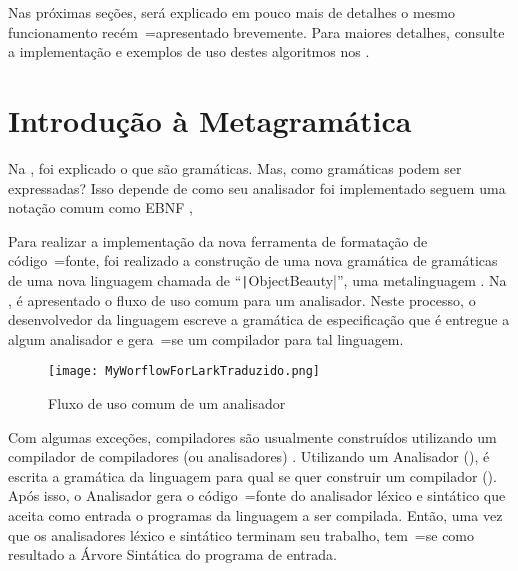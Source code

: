 Nas próximas seções,
será explicado em pouco mais de detalhes o mesmo funcionamento recém~=apresentado brevemente.
Para maiores detalhes,
consulte a implementação e
exemplos de uso destes algoritmos nos .


\section{Introdução à Metagramática}
\label{section:GrammarsGrammar}

Na ,
foi explicado o que são gramáticas.
Mas,
como gramáticas podem ser expressadas?
Isso depende de como seu analisador foi implementado  seguem uma notação comum como EBNF \cite{teachingEbnf,antlrBookTerrentParr,larkGrammarReference,larkStyleCheat},

Para realizar a implementação da nova ferramenta de formatação de código~=fonte,
foi realizado a construção de uma nova gramática de gramáticas de uma nova linguagem chamada de ``\texttt|ObjectBeauty|'',
uma metalinguagem \cite{compilersCompilerMetaLanguage}.
Na ,
é apresentado o fluxo de uso comum para um analisador.
Neste processo,
o desenvolvedor da linguagem escreve a gramática de especificação que é entregue a algum analisador e
gera~=se um compilador para tal linguagem.
\begin{figure}[!htb]
\caption{Fluxo de uso comum de um analisador}
\label{figure:MyWorflowForLarkTraduzido}
\centering
\texttt{[image: MyWorflowForLarkTraduzido.png]}
\end{figure}

Com algumas exceções,
compiladores são usualmente construídos utilizando um compilador de compiladores (ou analisadores) \cite{compilersCompilerMetaLanguage}.
Utilizando um Analisador (),
é escrita a gramática da linguagem para qual se quer construir um compilador ().
Após isso,
o Analisador gera o código~=fonte do analisador léxico e
sintático que aceita como entrada o programas da linguagem a ser compilada.
Então,
uma vez que os analisadores léxico e
sintático terminam seu trabalho,
tem~=se como resultado a Árvore Sintática do programa de entrada.

